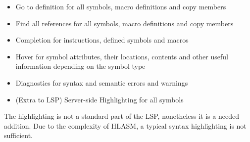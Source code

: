 \begin{itemize}
	\item Go to definition for all symbols, macro definitions and copy members
	\item Find all references for all symbols, macro definitions and copy members
	\item Completion for instructions, defined symbols and macros
	\item Hover for symbol attributes, their locations, contents and other useful information depending on the symbol type
	\item Diagnostics for syntax and semantic errors and warnings
	\item (Extra to LSP) Server-side Highlighting for all symbols  
\end{itemize}

The highlighting is not a standard part of the LSP, nonetheless it is a needed addition. Due to the complexity of HLASM, a typical syntax highlighting is not sufficient.
